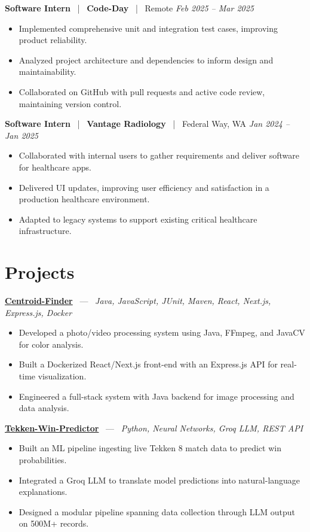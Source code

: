\documentclass[10pt, letterpaper]{article}
\newcommand{\jobhead}[4]{%
  \vspace{5pt}%
  {\bfseries\color{dark}#1}%
  ~{\color{light}|}~%
  {\bfseries\color{navy}#2}%
  ~{\color{light}|}~%
  {\color{light}#3}%
  \hfill{\color{light}\small\textit{#4}}\\[-2pt]%
}
\newcommand{\projhead}[3]{%
  \vspace{5pt}%
  {\bfseries\color{dark}\href{#2}{#1}}%
  ~{\color{light}---}~%
  {\color{light}\small\textit{#3}}\\[-2pt]%
}
\begin{document}
\jobhead{Software Intern}{Code-Day}{Remote}{Feb 2025 – Mar 2025}
\begin{itemize}
  \item Implemented comprehensive unit and integration test cases, improving product reliability.
  \item Analyzed project architecture and dependencies to inform design and maintainability.
  \item Collaborated on GitHub with pull requests and active code review, maintaining version control.
\end{itemize}

\jobhead{Software Intern}{Vantage Radiology}{Federal Way, WA}{Jan 2024 – Jan 2025}
\begin{itemize}
  \item Collaborated with internal users to gather requirements and deliver software for healthcare apps.
  \item Delivered UI updates, improving user efficiency and satisfaction in a production healthcare environment.
  \item Adapted to legacy systems to support existing critical healthcare infrastructure.
\end{itemize}

\section{Projects}

\projhead{Centroid-Finder}{https://github.com/xavierb117/centroid-finder}{Java, JavaScript, JUnit, Maven, React, Next.js, Express.js, Docker}
\begin{itemize}
  \item Developed a photo/video processing system using Java, FFmpeg, and JavaCV for color analysis.
  \item Built a Dockerized React/Next.js front-end with an Express.js API for real-time visualization.
  \item Engineered a full-stack system with Java backend for image processing and data analysis.
\end{itemize}

\projhead{Tekken-Win-Predictor}{}{Python, Neural Networks, Groq LLM, REST API}
\begin{itemize}
  \item Built an ML pipeline ingesting live Tekken 8 match data to predict win probabilities.
  \item Integrated a Groq LLM to translate model predictions into natural-language explanations.
  \item Designed a modular pipeline spanning data collection through LLM output on 500M+ records.
\end{itemize}
\end{document}
